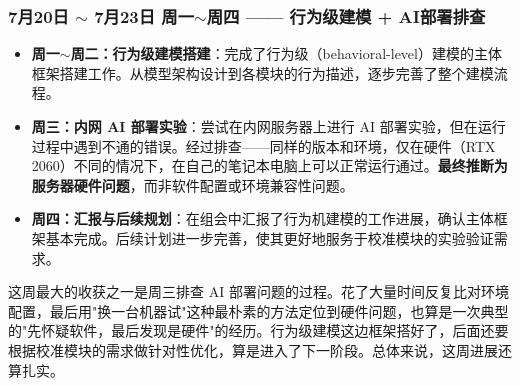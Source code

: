 \subsubsection{7月20日 $\sim$ 7月23日 周一$\sim$周四 —— 行为级建模 + AI部署排查}

\begin{itemize}
  \item \textbf{周一$\sim$周二：行为级建模搭建}：完成了行为级（behavioral-level）建模的主体框架搭建工作。从模型架构设计到各模块的行为描述，逐步完善了整个建模流程。
  \item \textbf{周三：内网 AI 部署实验}：尝试在内网服务器上进行 AI 部署实验，但在运行过程中遇到不通的错误。经过排查——同样的版本和环境，仅在硬件（RTX 2060）不同的情况下，在自己的笔记本电脑上可以正常运行通过。\textbf{最终推断为服务器硬件问题}，而非软件配置或环境兼容性问题。
  \item \textbf{周四：汇报与后续规划}：在组会中汇报了行为机建模的工作进展，确认主体框架基本完成。后续计划进一步完善，使其更好地服务于校准模块的实验验证需求。
\end{itemize}

\begin{personalnote}
这周最大的收获之一是周三排查 AI 部署问题的过程。花了大量时间反复比对环境配置，最后用"换一台机器试"这种最朴素的方法定位到硬件问题，也算是一次典型的"先怀疑软件，最后发现是硬件"的经历。行为级建模这边框架搭好了，后面还要根据校准模块的需求做针对性优化，算是进入了下一阶段。总体来说，这周进展还算扎实。
\end{personalnote}
